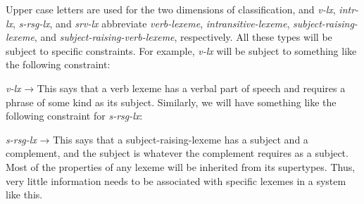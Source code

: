 \documentclass[output=paper]{langsci/langscibook}
\begin{document}
\ea\label{ex:borsley:4.2}
\z
%
Upper case letters are used for the two dimensions of classification, and \emph{v-lx}, \emph{intr-lx}, \emph{s-rsg-lx}, and \emph{srv-lx} abbreviate \emph{verb-lexeme}, \emph{intransitive-lexeme}, \emph{subject-raising-lexeme}, and \emph{subject-raising-verb-lexeme}, respectively. All these types will be subject to specific constraints. For example, \emph{v-lx} will be subject to something like the following constraint:

\ea\label{ex:borsley:4.3}
    \emph{v-lx} → 
\z
%
This says that a verb lexeme has a verbal part of speech and requires a phrase of some kind as its subject. Similarly, we will have something like the following constraint for \emph{s-rsg-lx}:

\ea\label{ex:borsley:4.4}
    \emph{s-rsg-lx} →   
\z
%
This says that a subject-raising-lexeme has a subject and a complement, and the
subject is whatever the complement requires as a subject. Most of the
properties of any lexeme will be inherited from its supertypes. Thus, very
little information needs to be associated with specific lexemes in a system
like this.
\end{document}

